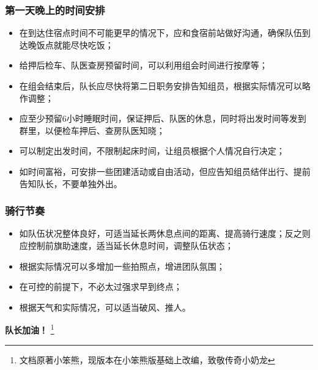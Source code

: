 \documentclass[UTF8]{ctexart}
\begin{document}
\subsubsection{第一天晚上的时间安排}

\begin{itemize}[nosep,left=2em]
    \item 在到达住宿点时间不可能更早的情况下，应和食宿前站做好沟通，确保队伍到达晚饭点就能尽快吃饭；
    \item 给押后检车、队医查房预留时间，可以利用组会时间进行按摩等；
    \item 在组会结束后，队长应尽快将第二日职务安排告知组员，根据实际情况可以略作调整；
    \item 应至少预留6小时睡眠时间，保证押后、队医的休息，同时将出发时间等发到群里，以便检车押后、查房队医知晓；
    \item 可以制定出发时间，不限制起床时间，让组员根据个人情况自行决定；
    \item 如时间富裕，可安排一些团建活动或自由活动，但应告知组员结伴出行、提前告知队长，不要单独外出。
\end{itemize}

\subsubsection{骑行节奏}

\begin{itemize}[nosep,left=2em]
    \item 如队伍状况整体良好，可适当延长两休息点间的距离、提高骑行速度；反之则应控制前旗助速度，适当延长休息时间，调整队伍状态；
    \item 根据实际情况可以多增加一些拍照点，增进团队氛围；
    \item 在可控的前提下，不必太过强求早到终点；
    \item 根据天气和实际情况，可以适当破风、推人。
\end{itemize}
\center\Large{\color{red}\textbf{队长加油！}}
\footnote{文档原著小笨熊，现版本在小笨熊版基础上改编，致敬传奇小奶龙}
\end{document}
